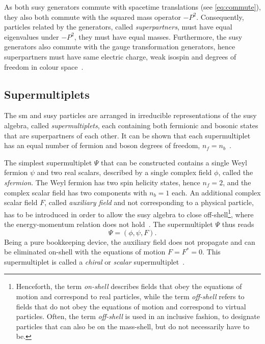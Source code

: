 As both \gls{susy} generators commute with spacetime translations (see \cref{eq:commute}), they also both commute with the squared mass operator $-P^2$. Consequently, particles related by the generators, called \textit{superpartners}, must have equal eigenvalues under $-P^2$, \ie they must have equal masses. Furthermore, the \gls{susy} generators also commute with the gauge transformation generators, hence superpartners must have same electric charge, weak isospin and degrees of freedom in colour space~\cite{Martin:1997ns}.

\subsection{Supermultiplets}\label{sec:supermultiplets}

The \gls{sm} and \gls{susy} particles are arranged in irreducible representations of the \gls{susy} algebra, called \textit{supermultiplets}, each containing both fermionic and bosonic states that are superpartners of each other. It can be shown that each supermultiplet has an equal number of fermion and boson degrees of freedom, $n_f = n_b$~\cite{Martin:1997ns}.

The simplest supermultiplet $\Psi$ that can be constructed contains a single Weyl fermion $\psi$ and two real scalars, described by a single complex field $\phi$, called the \textit{sfermion}. The Weyl fermion has two spin helicity states, hence $n_f=2$, and the complex scalar field has two components with $n_b=1$ each. An additional complex scalar field $F$, called \textit{auxiliary field} and not corresponding to a physical particle, has to be introduced in order to allow the \gls{susy} algebra to close off-shell\footnote{Henceforth, the term \textit{on-shell} describes fields that obey the equations of motion and correspond to real particles, while the term \textit{off-shell} refers to fields that do not obey the equations of motion and correspond to virtual particles. Often, the term \textit{off-shell} is used in an inclusive fashion, \ie to designate particles that can also be on the mass-shell, but do not necessarily have to be.}, where the energy-momentum relation does not hold~\cite{Martin:1997ns}. The supermultiplet $\Psi$ thus reads
\begin{equation}
	\Psi = (\phi,\psi,F).
\end{equation}
Being a pure bookkeeping device, the auxiliary field does not propagate and can be eliminated on-shell with the equations of motion $F=F^*=0$. This supermultiplet is called a \textit{chiral} or \textit{scalar} supermultiplet~\cite{Martin:1997ns}. 

